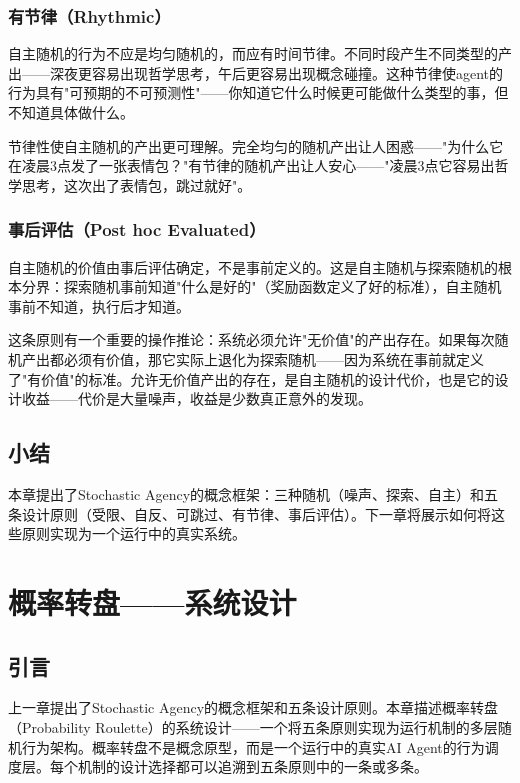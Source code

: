 \documentclass[12pt,a4paper]{ctexart}
\begin{document}
\subsubsection{有节律（Rhythmic）}

自主随机的行为不应是均匀随机的，而应有时间节律。不同时段产生不同类型的产出——深夜更容易出现哲学思考，午后更容易出现概念碰撞。这种节律使agent的行为具有"可预期的不可预测性"——你知道它什么时候更可能做什么类型的事，但不知道具体做什么。

节律性使自主随机的产出更可理解。完全均匀的随机产出让人困惑——"为什么它在凌晨3点发了一张表情包？"有节律的随机产出让人安心——"凌晨3点它容易出哲学思考，这次出了表情包，跳过就好"。

\subsubsection{事后评估（Post hoc Evaluated）}

自主随机的价值由事后评估确定，不是事前定义的。这是自主随机与探索随机的根本分界：探索随机事前知道"什么是好的"（奖励函数定义了好的标准），自主随机事前不知道，执行后才知道。

这条原则有一个重要的操作推论：系统必须允许"无价值"的产出存在。如果每次随机产出都必须有价值，那它实际上退化为探索随机——因为系统在事前就定义了"有价值"的标准。允许无价值产出的存在，是自主随机的设计代价，也是它的设计收益——代价是大量噪声，收益是少数真正意外的发现。

\subsection{小结}

本章提出了Stochastic Agency的概念框架：三种随机（噪声、探索、自主）和五条设计原则（受限、自反、可跳过、有节律、事后评估）。下一章将展示如何将这些原则实现为一个运行中的真实系统。


\section{概率转盘——系统设计}

\subsection{引言}

上一章提出了Stochastic Agency的概念框架和五条设计原则。本章描述概率转盘（Probability Roulette）的系统设计——一个将五条原则实现为运行机制的多层随机行为架构。概率转盘不是概念原型，而是一个运行中的真实AI Agent的行为调度层。每个机制的设计选择都可以追溯到五条原则中的一条或多条。
\end{document}
